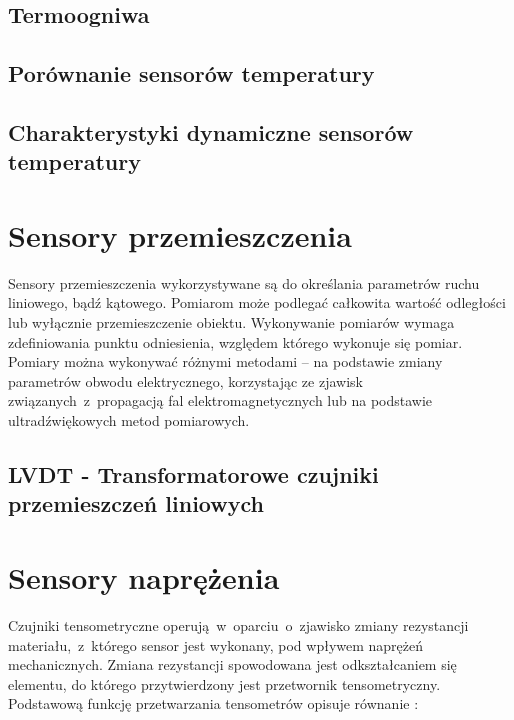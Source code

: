 \subsection{Termoogniwa}


\subsection{Porównanie sensorów temperatury}


\subsection{Charakterystyki dynamiczne sensorów temperatury}


\section{Sensory przemieszczenia}\label{sect:theory-lvdt}
Sensory przemieszczenia wykorzystywane są do określania parametrów ruchu liniowego, bądź kątowego.
Pomiarom może podlegać całkowita wartość odległości lub wyłącznie przemieszczenie obiektu.
Wykonywanie pomiarów wymaga zdefiniowania punktu odniesienia, względem którego wykonuje się pomiar.
Pomiary można wykonywać różnymi metodami -- na podstawie zmiany parametrów obwodu elektrycznego,
korzystając ze zjawisk związanych~z~propagacją fal elektromagnetycznych lub na podstawie
ultradźwiękowych metod pomiarowych.

\subsection{LVDT - Transformatorowe czujniki przemieszczeń liniowych}


\FloatBarrier
\section{Sensory naprężenia}\label{sect:theory-strain} Czujniki tensometryczne
operują~w~oparciu~o~zjawisko zmiany rezystancji materiału,~z~którego sensor jest wykonany, pod
wpływem naprężeń mechanicznych. Zmiana rezystancji spowodowana jest odkształcaniem się elementu, do
którego przytwierdzony jest przetwornik tensometryczny. Podstawową funkcję przetwarzania tensometrów
opisuje równanie \cite{hoffman1989, milek2006}:

